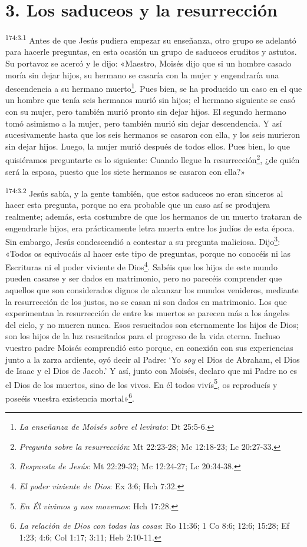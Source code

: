 \section*{3. Los saduceos y la resurrección}
\par
\textsuperscript{174:3.1} Antes de que Jesús pudiera empezar su enseñanza, otro grupo se adelantó para hacerle preguntas, en esta ocasión un grupo de saduceos eruditos y astutos. Su portavoz se acercó y le dijo: «Maestro, Moisés dijo que si un hombre casado moría sin dejar hijos, su hermano se casaría con la mujer y engendraría una descendencia a su hermano muerto\footnote{\textit{La enseñanza de Moisés sobre el levirato}: Dt 25:5-6.}. Pues bien, se ha producido un caso en el que un hombre que tenía seis hermanos murió sin hijos; el hermano siguiente se casó con su mujer, pero también murió pronto sin dejar hijos. El segundo hermano tomó asimismo a la mujer, pero también murió sin dejar descendencia. Y así sucesivamente hasta que los seis hermanos se casaron con ella, y los seis murieron sin dejar hijos. Luego, la mujer murió después de todos ellos. Pues bien, lo que quisiéramos preguntarte es lo siguiente: Cuando llegue la resurrección\footnote{\textit{Pregunta sobre la resurrección}: Mt 22:23-28; Mc 12:18-23; Lc 20:27-33.}, ¿de quién será la esposa, puesto que los siete hermanos se casaron con ella?»

\par
\textsuperscript{174:3.2} Jesús sabía, y la gente también, que estos saduceos no eran sinceros al hacer esta pregunta, porque no era probable que un caso así se produjera realmente; además, esta costumbre de que los hermanos de un muerto trataran de engendrarle hijos, era prácticamente letra muerta entre los judíos de esta época. Sin embargo, Jesús condescendió a contestar a su pregunta maliciosa. Dijo\footnote{\textit{Respuesta de Jesús}: Mt 22:29-32; Mc 12:24-27; Lc 20:34-38.}: «Todos os equivocáis al hacer este tipo de preguntas, porque no conocéis ni las Escrituras ni el poder viviente de Dios\footnote{\textit{El poder viviente de Dios}: Ex 3:6; Hch 7:32.}. Sabéis que los hijos de este mundo pueden casarse y ser dados en matrimonio, pero no parecéis comprender que aquellos que son considerados dignos de alcanzar los mundos venideros, mediante la resurrección de los justos, no se casan ni son dados en matrimonio. Los que experimentan la resurrección de entre los muertos se parecen más a los ángeles del cielo, y no mueren nunca. Esos resucitados son eternamente los hijos de Dios; son los hijos de la luz resucitados para el progreso de la vida eterna. Incluso vuestro padre Moisés comprendió esto porque, en conexión con sus experiencias junto a la zarza ardiente, oyó decir al Padre: `Yo \textit{soy} el Dios de Abraham, el Dios de Isaac y el Dios de Jacob.' Y así, junto con Moisés, declaro que mi Padre no es el Dios de los muertos, sino de los vivos. En él todos vivís\footnote{\textit{En Él vivimos y nos movemos}: Hch 17:28.}, os reproducís y poseéis vuestra existencia mortal»\footnote{\textit{La relación de Dios con todas las cosas}: Ro 11:36; 1 Co 8:6; 12:6; 15:28; Ef 1:23; 4:6; Col 1:17; 3:11; Heb 2:10-11.}.

